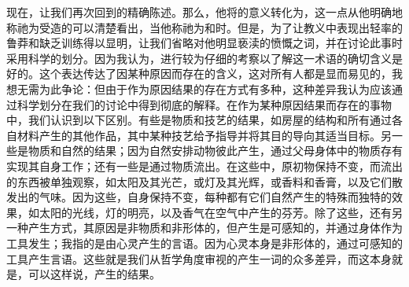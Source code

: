 现在，让我们再次回到的精确陈述。那么，他将的意义转化为，这一点从他明确地称祂为受造的可以清楚看出，当他称祂为和时。但是，为了让教义中表现出轻率的鲁莽和缺乏训练得以显明，让我们省略对他明显亵渎的愤慨之词，并在讨论此事时采用科学的划分。因为我认为，进行较为仔细的考察以了解这一术语的确切含义是好的。这个表达传达了因某种原因而存在的含义，这对所有人都是显而易见的，我想无需为此争论：但由于作为原因结果的存在方式有多种，这种差异我认为应该通过科学划分在我们的讨论中得到彻底的解释。在作为某种原因结果而存在的事物中，我们认识到以下区别。有些是物质和技艺的结果，如房屋的结构和所有通过各自材料产生的其他作品，其中某种技艺给予指导并将其目的导向其适当目标。另一些是物质和自然的结果；因为自然安排动物彼此产生，通过父母身体中的物质存有实现其自身工作；还有一些是通过物质流出。在这些中，原初物保持不变，而流出的东西被单独观察，如太阳及其光芒，或灯及其光辉，或香料和香膏，以及它们散发出的气味。因为这些，自身保持不变，每种都有它们自然产生的特殊而独特的效果，如太阳的光线，灯的明亮，以及香气在空气中产生的芬芳。除了这些，还有另一种产生方式，其原因是非物质和非形体的，但产生是可感知的，并通过身体作为工具发生；我指的是由心灵产生的言语。因为心灵本身是非形体的，通过可感知的工具产生言语。这些就是我们从哲学角度审视的产生一词的众多差异，而这本身就是，可以这样说，产生的结果。\par

